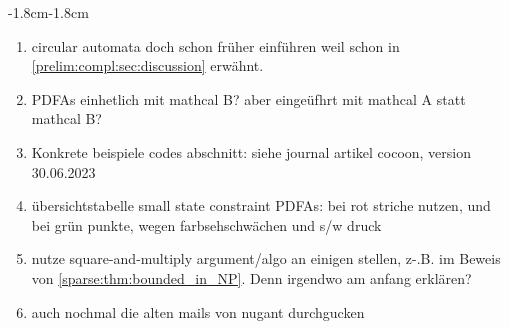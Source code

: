 \begin{adjustwidth}{-1.8cm}{-1.8cm}
\begin{enumerate}[itemsep=-5pt]
	\item circular automata doch schon früher einführen weil schon in \cref{prelim:compl:sec:discussion} erwähnt.
	
	\item PDFAs einhetlich mit mathcal B? aber eingeüfhrt mit mathcal A statt mathcal B?
		
	\item Konkrete beispiele codes abschnitt: siehe journal artikel cocoon, version 30.06.2023 
		
	\item übersichtstabelle small state constraint PDFAs: bei rot striche nutzen, und bei grün punkte, wegen farbsehschwächen und s/w druck
	
	\item nutze square-and-multiply argument/algo an einigen stellen, z-.B. im Beweis von \cref{sparse:thm:bounded_in_NP}. Denn irgendwo am anfang erklären?
	
	\item auch nochmal die alten mails von nugant durchgucken
	
	\end{enumerate}
\end{adjustwidth}





